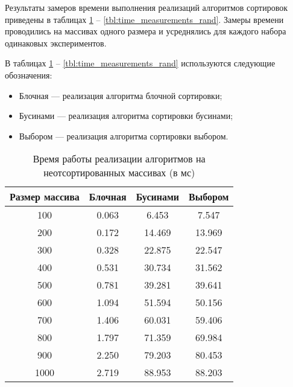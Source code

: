 Результаты замеров времени выполнения реализаций алгоритмов сортировок приведены в таблицах \ref{tbl:time_measurements} -- \ref{tbl:time_measurements_rand}.
Замеры времени проводились на массивах одного размера и усреднялись для каждого набора одинаковых экспериментов.

В таблицах \ref{tbl:time_measurements} -- \ref{tbl:time_measurements_rand} используются следующие обозначения: 
\begin{itemize}
	\item Блочная --- реализация алгоритма блочной сортировки;
	\item Бусинами --- реализация алгоритма сортировки бусинами;
	\item Выбором --- реализация алгоритма сортировки выбором.
\end{itemize}



\clearpage
\begin{table}[H]
	\begin{center}
		\begin{threeparttable}
			\captionsetup{justification=raggedright,singlelinecheck=off}
			\caption{Время работы реализации алгоритмов на неотсортированных массивах (в мс)}
			\label{tbl:time_measurements}
			\begin{tabular}{|c|c|c|c|}
				\hline
				Размер массива & Блочная & Бусинами & Выбором \\
			
			\hline
			100 & 0.063 & 6.453 & 7.547 \\
			\hline
			200 & 0.172 & 14.469 & 13.969 \\
			\hline
			300 & 0.328 & 22.875 & 22.547 \\
			\hline
			400 & 0.531 & 30.734 & 31.562 \\
			\hline
			500 & 0.781 & 39.281 & 39.641 \\
			\hline
			600 & 1.094 & 51.594 & 50.156 \\
			\hline
			700 & 1.406 & 60.031 & 59.406 \\
			\hline
			800 & 1.797 & 71.359 & 69.984 \\
			\hline
			900 & 2.250 & 79.203 & 80.453 \\
			\hline
			1000 & 2.719 & 88.953 & 88.203 \\
			
				\hline
			\end{tabular}
		\end{threeparttable}
	\end{center}
\end{table}

